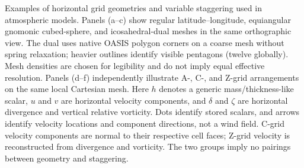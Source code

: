 \caption{Examples of horizontal grid geometries and variable staggering used
in atmospheric models. Panels (a--c) show regular latitude--longitude,
equiangular gnomonic cubed-sphere, and icosahedral-dual meshes in the same
orthographic view. The dual uses native OASIS polygon corners on a coarse
mesh without spring relaxation; heavier outlines identify visible pentagons
(twelve globally). Mesh densities are chosen for legibility and do not imply
equal effective resolution. Panels (d--f) independently illustrate A-, C-,
and Z-grid arrangements on the same local Cartesian mesh. Here $h$ denotes a
generic mass/thickness-like scalar, $u$ and $v$ are horizontal velocity
components, and $\delta$ and $\zeta$ are horizontal divergence and vertical
relative vorticity. Dots identify stored scalars, and arrows identify velocity
locations and component directions, not a wind field. C-grid velocity
components are normal to their respective cell faces; Z-grid velocity is
reconstructed from divergence and vorticity. The two groups imply no pairings
between geometry and staggering.}
\label{fig:horizontal-grid-geometry-staggering}
